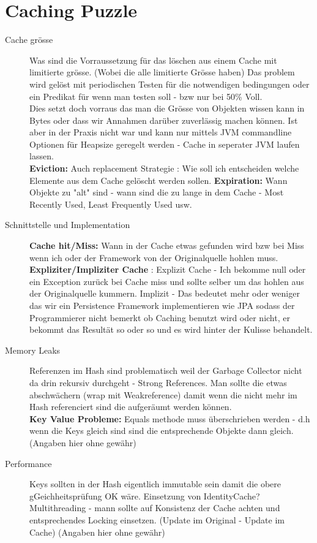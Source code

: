 \documentclass[a4paper,10pt]{scrreprt}
\begin{document}
\chapter{Caching Puzzle} %
\label{cha:caching_puzzle}
\begin{description}
	\item[Cache grösse] Was sind die Vorraussetzung für das löschen aus einem Cache mit limitierte grösse. (Wobei die alle limitierte Grösse haben)
	Das problem wird gelöst mit periodischen Testen für die notwendigen bedingungen oder ein Predikat für wenn man testen soll - bzw nur bei 50\% Voll.\\
	Dies setzt doch vorraus das man die Grösse von Objekten wissen kann in Bytes oder dass wir Annahmen darüber zuverlässig machen können. Ist aber in der Praxis nicht war und kann nur mittels JVM commandline Optionen für Heapsize geregelt werden - Cache in seperater JVM laufen lassen.\\
	\textbf{Eviction:} Auch replacement Strategie : Wie soll ich entscheiden welche  Elemente aus dem Cache gelöscht werden sollen.
	\textbf{Expiration:} Wann Objekte zu "alt" sind - wann sind die zu lange in dem Cache - Most Recently Used, Least Frequently Used usw.
	\item [Schnittstelle und Implementation] \textbf{Cache hit/Miss:} Wann in der Cache etwas gefunden wird bzw bei Miss wenn ich oder der Framework von der Originalquelle hohlen muss. \\
	\textbf{Expliziter/Impliziter Cache} : Explizit Cache - Ich bekomme null oder ein Exception zurück bei Cache miss und sollte selber um das hohlen aus der Originalquelle kummern. Implizit - Das bedeutet mehr oder weniger das wir ein Persistence Framework implementieren wie JPA sodass der Programmierer nicht bemerkt ob Caching benutzt wird oder nicht, er  bekommt das Resultät so oder so und es wird hinter der Kulisse behandelt.
	\item[Memory Leaks] Referenzen im Hash sind problematisch weil der Garbage Collector nicht da drin rekursiv durchgeht - Strong References. Man sollte die etwas abschwächern (wrap mit Weakreference) damit wenn die nicht mehr im Hash referenciert sind die aufgeräumt werden können. \\
	\textbf{Key Value Probleme:} Equals methode muss überschrieben werden - d.h wenn die Keys gleich sind sind die entsprechende Objekte dann gleich.\\
	(Angaben hier ohne gewähr)
	\item[Performance] Keys sollten in der Hash eigentlich immutable sein damit die obere gGeichheitsprüfung OK wäre. Einsetzung  von IdentityCache? Multithreading - mann sollte auf Konsistenz der Cache achten und entsprechendes Locking einsetzen. (Update im Original - Update im Cache)
	(Angaben hier ohne gewähr)\\
\end{description}
\end{document}
